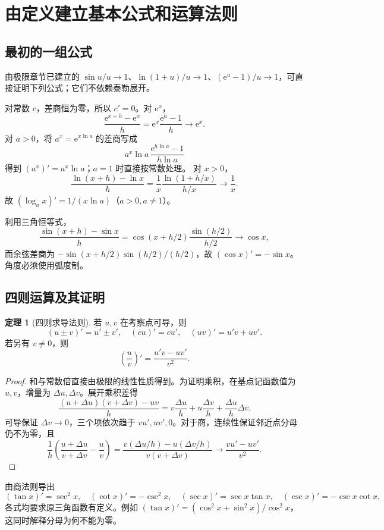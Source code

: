 \documentclass[UTF8,fontset=fandol,12pt,oneside,openany]{ctexrep}
\newcommand{\ee}{\mathrm e}
\theoremstyle{definition}
\newtheorem{theorem}{定理}[chapter]
\begin{document}
\section{由定义建立基本公式和运算法则}
\label{lec:05:rules}

\subsection{最初的一组公式}
由极限章节已建立的 $\sin u/u\to1$、$\ln(1+u)/u\to1$、$(\ee^u-1)/u\to1$，可直接证明下列公式；它们不依赖泰勒展开。

对常数 $c$，差商恒为零，所以 $c'=0$。对 $\ee^x$，
\[
 \frac{\ee^{x+h}-\ee^x}h=\ee^x\frac{\ee^h-1}h\longrightarrow\ee^x.
\]
对 $a>0$，将 $a^x=\ee^{x\ln a}$ 的差商写成
\[
 a^x\ln a\,\frac{\ee^{h\ln a}-1}{h\ln a}
\]
得到 $(a^x)'=a^x\ln a$；$a=1$ 时直接按常数处理。
对 $x>0$，
\[
 \frac{\ln(x+h)-\ln x}h
 =\frac1x\frac{\ln(1+h/x)}{h/x}\longrightarrow\frac1x.
\]
故 $(\log_a x)'=1/(x\ln a)$（$a>0,a\ne1$）。

利用三角恒等式，
\[
 \frac{\sin(x+h)-\sin x}h
 =\cos(x+h/2)\frac{\sin(h/2)}{h/2}\longrightarrow\cos x,
\]
而余弦差商为 $-\sin(x+h/2)\sin(h/2)/(h/2)$，故 $(\cos x)'=-\sin x$。角度必须使用弧度制。

\subsection{四则运算及其证明}
\begin{theorem}[四则求导法则]
若 $u,v$ 在考察点可导，则
\[
 (u\pm v)'=u'\pm v',\quad (cu)'=cu',\quad
 (uv)'=u'v+uv'.
\]
若另有 $v\ne0$，则
\[
 \left(\frac uv\right)'=\frac{u'v-uv'}{v^2}.
\]
\end{theorem}
\begin{proof}
和与常数倍直接由极限的线性性质得到。为证明乘积，在基点记函数值为 $u,v$，增量为 $\Delta u,\Delta v$。展开乘积差得
\[
 \frac{(u+\Delta u)(v+\Delta v)-uv}h
 =v\frac{\Delta u}h+u\frac{\Delta v}h
  +\frac{\Delta u}h\Delta v.
\]
可导保证 $\Delta v\to0$，三个项依次趋于 $vu',uv',0$。对于商，连续性保证邻近点分母仍不为零，且
\[
 \frac1h\left(\frac{u+\Delta u}{v+\Delta v}-\frac uv\right)
 =\frac{v(\Delta u/h)-u(\Delta v/h)}{v(v+\Delta v)}
 \longrightarrow\frac{vu'-uv'}{v^2}.
\]
\end{proof}

由商法则导出
\[
 (\tan x)'=\sec^2x,\quad(\cot x)'=-\csc^2x,
 \quad(\sec x)'=\sec x\tan x,\quad
 (\csc x)'=-\csc x\cot x,
\]
各式均要求原三角函数有定义。例如
$ (\tan x)'=(\cos^2x+\sin^2x)/\cos^2x$，这同时解释分母为何不能为零。
\end{document}
